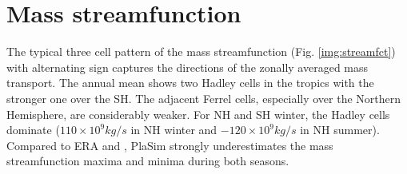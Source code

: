 \documentclass[12pt,a4paper,twoside,openright,headinclude,liststotoc,bibtotoc]{scrreprt}
\begin{document}
\vspace{-0.4cm}
\section{Mass streamfunction}
\vspace{-0.4cm}

The typical three cell pattern of the mass streamfunction (Fig. \ref{img:streamfct}) with alternating sign captures the directions of the zonally averaged mass transport. The annual mean shows two Hadley cells in the tropics with the stronger one over the SH. The adjacent Ferrel cells, especially over the Northern Hemisphere, are considerably weaker. For NH and SH winter, the Hadley cells dominate ($110\times 10^{9} kg/s$ in NH winter and $-120\times 10^{9} kg/s$ in NH summer). Compared to ERA and \citet[p. 159]{Peixoto1993}, PlaSim strongly underestimates the mass streamfunction maxima and minima during both seasons.
\end{document}
